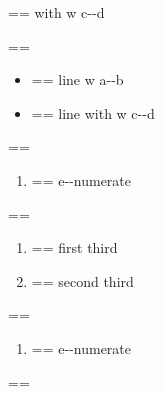 \documentclass{book}
\makeatletter
\newenvironment{GNUTexinfopreformatted}{%
  \par\GNUTobeylines\obeyspaces\frenchspacing
  \parskip=\z@\parindent=\z@}{}
{\catcode`\^^M=13 \gdef\GNUTobeylines{\catcode`\^^M=13 \def^^M{\null\par}}}
\newenvironment{GNUTexinfoindented}
  {\begin{list}{}{}
  \item\relax}
  {\end{list}}
\makeatother
\begin{document}
\begin{GNUTexinfoindented}
\begin{itemize}[label={}]
\begin{GNUTexinfopreformatted}
\ttfamily with w c{-}{-}d
\end{GNUTexinfopreformatted}
\end{itemize}
\begin{GNUTexinfopreformatted}%
\ttfamily 
\end{GNUTexinfopreformatted}
\begin{itemize}[label=\hbox{} on a line]
\item \begin{GNUTexinfopreformatted}%
\ttfamily line w a{-}{-}b
\end{GNUTexinfopreformatted}
\item \begin{GNUTexinfopreformatted}%
\ttfamily line with w c{-}{-}d
\end{GNUTexinfopreformatted}
\end{itemize}
\begin{GNUTexinfopreformatted}%
\ttfamily 
\end{GNUTexinfopreformatted}
\begin{enumerate}[start=1]
\item \begin{GNUTexinfopreformatted}%
\ttfamily e{-}{-}numerate
\end{GNUTexinfopreformatted}
\end{enumerate}
\begin{GNUTexinfopreformatted}%
\ttfamily 
\end{GNUTexinfopreformatted}
\begin{enumerate}[start=3]
\item \begin{GNUTexinfopreformatted}%
\ttfamily first third
\end{GNUTexinfopreformatted}
\item \begin{GNUTexinfopreformatted}%
\ttfamily second third
\end{GNUTexinfopreformatted}
\end{enumerate}
\begin{GNUTexinfopreformatted}%
\ttfamily 
\end{GNUTexinfopreformatted}
\begin{enumerate}[label=\alph*.]
\item \begin{GNUTexinfopreformatted}%
\ttfamily e{-}{-}numerate
\end{GNUTexinfopreformatted}
\end{enumerate}
\begin{GNUTexinfopreformatted}%

\end{GNUTexinfopreformatted}
\end{GNUTexinfoindented}
\end{document}
